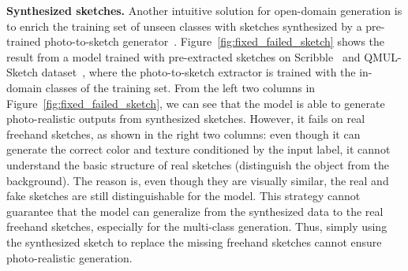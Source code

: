 \documentclass[10pt,twocolumn,letterpaper]{article}
\begin{document}
\noindent \textbf{Synthesized sketches.} Another intuitive solution for open-domain generation is to enrich the training set of unseen classes  with sketches synthesized by a pre-trained photo-to-sketch generator~\cite{liu2019unpaired}. Figure~\ref{fig:fixed_failed_sketch} shows the result from a model trained with pre-extracted sketches on Scribble~\cite{ghosh2019interactive} and QMUL-Sketch dataset~\cite{yu2016sketch,song2017deep,liu2019unpaired}, where the photo-to-sketch extractor is trained with the in-domain classes of the training set. From the left two columns in Figure~\ref{fig:fixed_failed_sketch}, we can see that the model is able to generate photo-realistic outputs from synthesized sketches. However, it fails on real freehand sketches, as shown in the right two columns: even though it can generate the correct color and texture conditioned by the input label, it cannot understand the basic structure of real sketches (\eg distinguish the object from the background). The reason is, even though they are visually similar, the real and fake sketches are still distinguishable for the model. This strategy cannot guarantee that the model can generalize from the synthesized data to the real freehand sketches, especially for the multi-class generation. Thus, simply using the synthesized sketch to replace the missing freehand sketches cannot ensure photo-realistic generation. 
\end{document}
